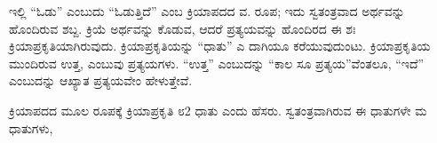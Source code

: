 \indent ಇಲ್ಲಿ “ಓಡು” ಎಂಬುದು “ಓಡುತ್ತಿದೆ” ಎಂಬ ಕ್ರಿಯಾಪದದ ವ. ರೂಪ; ಇದು ಸ್ವತಂತ್ರವಾದ ಅರ್ಥವನ್ನು ಹೊಂದಿರುವ ಶಬ್ದ. ಕ್ರಿಯೆ ಅರ್ಥವನ್ನು ಕೊಡುವ, ಆದರೆ ಪ್ರತ್ಯಯವನ್ನು ಹೊಂದಿರದ ಈ ಶಃ ಕ್ರಿಯಾಪ್ರಕೃತಿಯಾಗಿರುವುದು. ಕ್ರಿಯಾಪ್ರಕೃತಿಯನ್ನು “ಧಾತು” ಎ ದಾಗಿಯೂ ಕರೆಯುವುದುಂಟು. ಕ್ರಿಯಾಪ್ರಕೃತಿಯ ಮುಂದಿರುವ ಉತ್ತ, ಎಂಬುವು ಪ್ರತ್ಯಯಗಳು. “ಉತ್ತ” ಎಂಬುದನ್ನು “ಕಾಲ ಸೂ ಪ್ರತ್ಯಯ”ವೆಂತಲೂ, “ಇದೆ” ಎಂಬುದನ್ನು ಆಖ್ಯಾತ ಪ್ರತ್ಯಯವೇಂ ಹೇಳುತ್ತೇವೆ.\par

\begin{kbvrule}
\hspace{0.5em}ಕ್ರಿಯಾಪದದ ಮೂಲ ರೂಪಕ್ಕೆ ಕ್ರಿಯಾಪ್ರಕೃತಿ ೮2 ಧಾತು ಎಂದು ಹೆಸರು. ಸ್ವತಂತ್ರವಾಗಿರುವ ಈ ಧಾತುಗಳೇ ಮ ಧಾತುಗಳು,
\end{kbvrule}
